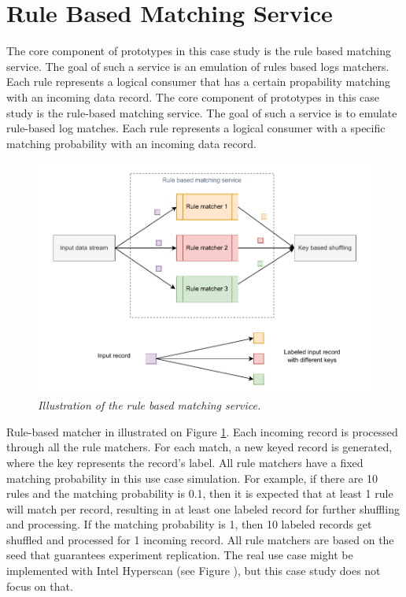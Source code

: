\section{Rule Based Matching Service}\label{sec:rule-based-matching-service}
The core component of prototypes in this case study is the rule based matching service.
The goal of such a service is an emulation of rules based logs matchers.
Each rule represents a logical consumer that has a certain propability matching with
an incoming data record.
The core component of prototypes in this case study is the rule-based matching service.
The goal of such a service is to emulate rule-based log matches.
Each rule represents a logical consumer with a specific matching probability
with an incoming data record.


\begin{figure}[H]
    \centering
    \includegraphics[width=1\textwidth]{figures/rule-matcher}
    \caption{\textit{Illustration of the rule based matching service.}}
    \label{fig:rule-matcher}
\end{figure}

Rule-based matcher in illustrated on Figure \ref{fig:rule-matcher}.
Each incoming record is processed through all the rule matchers. For each match, a new keyed record is generated,
where the key represents the record's label.
All rule matchers have a fixed matching probability in this use case simulation.
For example, if there are 10 rules and the matching probability is 0.1,
then it is expected that at least 1 rule will match per record,
resulting in at least one labeled record for further shuffling and processing.
If the matching probability is 1, then 10 labeled records get shuffled and processed for 1 incoming record.
All rule matchers are based on the seed that guarantees experiment replication.
The real use case might be implemented with Intel Hyperscan (see Figure \cite{intelHyperscan}),
but this case study does not focus on that.
